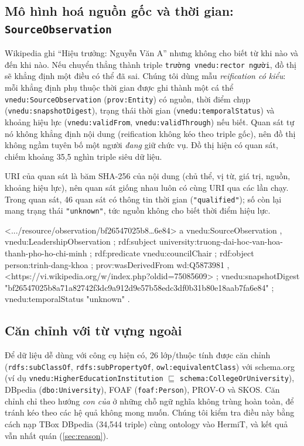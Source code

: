 \documentclass[12pt,a4paper]{article}
\newcommand{\codetitle}[1]{\par\smallskip\noindent{\small\bfseries #1}\par\nopagebreak}
\newcommand{\vn}[1]{\texttt{vnedu:\allowbreak #1}}
\begin{document}
\subsection{Mô hình hoá nguồn gốc và thời gian: \texttt{SourceObservation}}
Wikipedia ghi ``Hiệu trưởng: Nguyễn Văn A'' nhưng không cho biết từ khi nào và đến khi nào. Nếu chuyển thẳng thành
triple \texttt{trường vnedu:rector người}, đồ thị sẽ khẳng định một điều có thể đã sai. Chúng tôi dùng mẫu
\emph{reification có kiểu}: mỗi khẳng định phụ thuộc thời gian được ghi thành một cá thể \vn{SourceObservation}
(\texttt{prov:Entity}) có nguồn, thời điểm chụp (\vn{snapshotDigest}), trạng thái thời gian (\vn{temporalStatus}) và
khoảng hiệu lực (\vn{validFrom}, \vn{validThrough}) nếu biết. Quan sát tự nó không khẳng định nội dung
(reification không kéo theo triple gốc), nên đồ thị không ngầm tuyên bố một người \emph{đang} giữ chức vụ. Đồ thị hiện có \metricObservations{} quan sát, chiếm khoảng 35{,}5 nghìn triple siêu dữ liệu.

URI của quan sát là băm SHA-256 của nội dung (chủ thể, vị từ, giá trị, nguồn, khoảng hiệu lực), nên quan sát giống
nhau luôn có cùng URI qua các lần chạy. Trong \metricObservations{} quan sát, 46 quan sát có thông tin thời gian
(\texttt{"qualified"}); số còn lại mang trạng thái \texttt{"unknown"}, tức nguồn không cho biết thời điểm hiệu lực.

\codetitle{Một quan sát lãnh đạo thật trong đồ thị (rút gọn URI)}
\begin{code}
<.../resource/observation/bf26547025b8…6e84>
    a vnedu:SourceObservation , vnedu:LeadershipObservation ;
    rdf:subject   university:truong-dai-hoc-van-hoa-thanh-pho-ho-chi-minh ;
    rdf:predicate vnedu:councilChair ;
    rdf:object    person:trinh-dang-khoa ;
    prov:wasDerivedFrom wd:Q5873981 , <https://vi.wikipedia.org/w/index.php?oldid=75085609> ;
    vnedu:snapshotDigest "bf26547025b8a71a82742f3dc9a912d9e57b58edc3df0b31b80e18aab7fa6e84" ;
    vnedu:temporalStatus "unknown" .
\end{code}

\subsection{Căn chỉnh với từ vựng ngoài}
Để dữ liệu dễ dùng với công cụ hiện có, 26 lớp/thuộc tính được căn chỉnh (\texttt{rdfs:subClassOf},
\texttt{rdfs:subPropertyOf}, \texttt{owl:equivalentClass}) với schema.org~\cite{guha2016schemaorg} (ví dụ
\vn{HigherEducationInstitution} \(\sqsubseteq\) \texttt{schema:CollegeOrUniversity}), DBpedia (\texttt{dbo:University}),
FOAF (\texttt{foaf:Person}), PROV-O và SKOS. Căn chỉnh chỉ theo hướng \emph{con của} ở những chỗ ngữ nghĩa không trùng
hoàn toàn, để tránh kéo theo các hệ quả không mong muốn. Chúng tôi kiểm tra điều này bằng cách nạp TBox DBpedia
(34{,}544 triple) cùng ontology vào HermiT, và kết quả vẫn nhất quán (\cref{sec:reason}).
\end{document}
